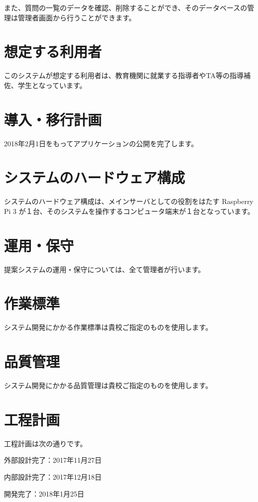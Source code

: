 \documentclass[a4j,titlepage]{ujarticle}
\begin{document}
また、質問の一覧のデータを確認、削除することができ、そのデータベースの管理は管理者画面から行うことができます。

\section{想定する利用者}
このシステムが想定する利用者は、教育機関に就業する指導者やTA等の指導補佐、学生となっています。 %

\section{導入・移行計画}
2018年2月1日をもってアプリケーションの公開を完了します。

\section{システムのハードウェア構成}
システムのハードウェア構成は、メインサーバとしての役割をはたす Raspberry Pi 3 が１台、そのシステムを操作するコンピュータ端末が１台となっています。 %

\section{運用・保守}
提案システムの運用・保守については、全て管理者が行います。 %

\section{作業標準}
システム開発にかかる作業標準は貴校ご指定のものを使用します。

\section{品質管理}
システム開発にかかる品質管理は貴校ご指定のものを使用します。

\section{工程計画}
工程計画は次の通りです。

外部設計完了：2017年11月27日

内部設計完了：2017年12月18日

開発完了：2018年1月25日
\end{document}

